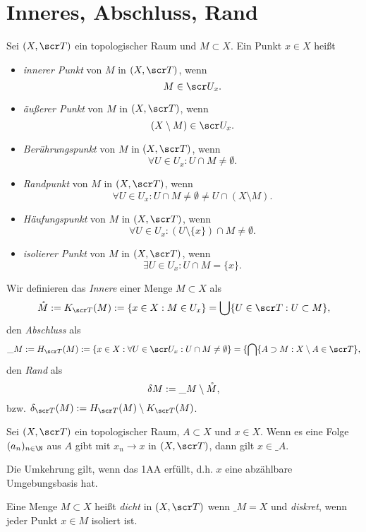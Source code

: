 \section{Inneres, Abschluss, Rand}


Sei $(X, \scr T)$ ein topologischer Raum und $M \subset X$.
Ein Punkt $x \in X$ heißt
\begin{itemize}
	\item
		\emph{innerer Punkt} von $M$ in $(X,\scr T)$, wenn
		\[
			M \in \scr U_x.
		\]
	\item
		\emph{äußerer Punkt} von $M$ in $(X,\scr T)$, wenn
		\[
			(X \setminus M) \in \scr U_x.
		\]
	\item
		\emph{Berührungspunkt} von $M$ in $(X, \scr T)$, wenn
		\[
			\forall U \in U_x : U \cap M \neq \emptyset.
		\]
	\item
		\emph{Randpunkt} von $M$ in $(X, \scr T)$, wenn
		\[
			\forall U \in U_x : U \cap M \neq \emptyset \neq U \cap (X \setminus M).
		\]
	\item
		\emph{Häufungspunkt} von $M$ in $(X, \scr T)$, wenn
		\[
			\forall U \in U_x : (U \setminus \{x\}) \cap M \neq \emptyset.
		\]
	\item
		\emph{isolierer Punkt} von $M$ in $(X, \scr T)$, wenn
		\[
			\exists U \in U_x : U \cap M = \{x\}.
		\]
\end{itemize}

\begin{df}
	Wir definieren das \emph{Innere} einer Menge $M \subset X$ als
	\[
		\mathring M
		:= K_{\scr T}(M)
		:= \{ x \in X : M \in U_x \}
		= \bigcup \{ U \in \scr T : U \subset M \},
	\]
	den \emph{Abschluss} als
	\[
		\_{M}
		:= H_{\scr T}(M)
		:= \{ x \in X : \forall U \in \scr U_x : U \cap M \neq \emptyset \}
		= \{ \bigcap \{ A \supset M : X \setminus A \in \scr T \},
	\]
	den \emph{Rand} als
	\[
		\delta M
		:= \_ M \setminus \mathring M,
	\]
	bzw. $\delta_{\scr T}(M) := H_{\scr T}(M) \setminus K_{\scr T}(M)$.
\end{df}

\begin{st}
	Sei $(X, \scr T)$ ein topologischer Raum, $A \subset X$ und $x \in X$.
	Wenn es eine Folge $(a_n)_{n\in\N}$ aus $A$ gibt mit $x_n \to x$ in $(X, \scr T)$, dann gilt $x \in \_A$.

	Die Umkehrung gilt, wenn das 1AA erfüllt, d.h. $x$ eine abzählbare Umgebungsbasis hat.
\end{st}

\begin{df}
	Eine Menge $M \subset X$ heißt \emph{dicht} in $(X, \scr T)$ wenn $\_M = X$ und \emph{diskret}, wenn jeder Punkt $x \in M$ isoliert ist.
\end{df}

